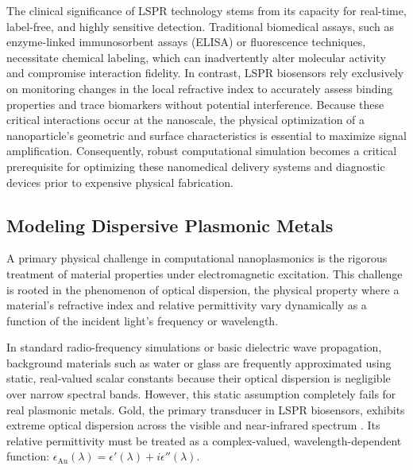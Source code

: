 \documentclass[class=report, crop=false]{standalone}
\begin{document}
The clinical significance of LSPR technology stems from its capacity for real-time, label-free, and highly sensitive detection. Traditional biomedical assays, such as enzyme-linked immunosorbent assays (ELISA) or fluorescence techniques, necessitate chemical labeling, which can inadvertently alter molecular activity and compromise interaction fidelity. In contrast, LSPR biosensors rely exclusively on monitoring changes in the local refractive index to accurately assess binding properties and trace biomarkers without potential interference. Because these critical interactions occur at the nanoscale, the physical optimization of a nanoparticle's geometric and surface characteristics is essential to maximize signal amplification. Consequently, robust computational simulation becomes a critical prerequisite for optimizing these nanomedical delivery systems and diagnostic devices prior to expensive physical fabrication.

\subsection{Modeling Dispersive Plasmonic Metals}

A primary physical challenge in computational nanoplasmonics is the rigorous treatment of material properties under electromagnetic excitation. This challenge is rooted in the phenomenon of optical dispersion, the physical property where a material's refractive index and relative permittivity vary dynamically as a function of the incident light's frequency or wavelength.

\vspace{12pt}

In standard radio-frequency simulations or basic dielectric wave propagation, background materials such as water or glass are frequently approximated using static, real-valued scalar constants because their optical dispersion is negligible over narrow spectral bands. However, this static assumption completely fails for real plasmonic metals. Gold, the primary transducer in LSPR biosensors, exhibits extreme optical dispersion across the visible and near-infrared spectrum \citep{Mayer2011}. Its relative permittivity must be treated as a complex-valued, wavelength-dependent function: $\epsilon_{\text{Au}}(\lambda) = \epsilon'(\lambda) + i\epsilon''(\lambda)$.

\vspace{12pt}
\end{document}
